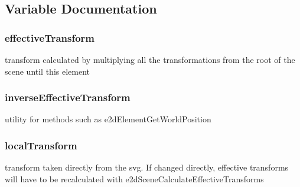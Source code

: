 \subsection{Variable Documentation}
\hypertarget{group__transformations_ga6c8e26945f09b5157e2111e42f99b879}{
\subsubsection[{effective\-Transform}]{ effective\-Transform}}\label{group__transformations_ga6c8e26945f09b5157e2111e42f99b879}
transform calculated by multiplying all the transformations from the root of the scene until this element \hypertarget{group__transformations_ga5e6d7341f2dbef1923b0a3fcc13781c6}{
\subsubsection[{inverse\-Effective\-Transform}]{ inverse\-Effective\-Transform}}\label{group__transformations_ga5e6d7341f2dbef1923b0a3fcc13781c6}
utility for methods such as e2d\-Element\-Get\-World\-Position \hypertarget{group__transformations_ga52bda732df714953f93c1e6f5f7c7c93}{
\subsubsection[{local\-Transform}]{ local\-Transform}}\label{group__transformations_ga52bda732df714953f93c1e6f5f7c7c93}
transform taken directly from the svg. If changed directly, effective transforms will have to be recalculated with e2d\-Scene\-Calculate\-Effective\-Transforms 